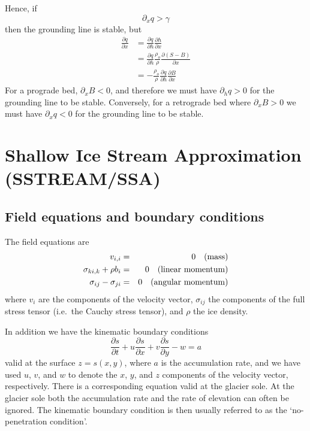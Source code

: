 \documentclass[10pt,a4paper]{book}
\newcommand{\p}{\partial}
\begin{document}
Hence, if
\[
  \p_x q > \gamma
\]
then the grounding line is stable, but
\begin{align*}
  \frac{\p q}{\p x} &= \frac{\p q}{\p h} \frac{\p h}{\p x} \\
  &= \frac{\p q}{\p h} \frac{\rho_o}{\rho} \frac{\p (S-B)}{\p x}\\
  &= -  \frac{\rho_o}{\rho}\frac{\p q}{\p h} \frac{\p B}{\p x}
\end{align*}
For a prograde bed, $\p_x B <0$, and therefore we must have $\p_h q >0$
for the grounding line to be stable. Conversely, for a retrograde bed where $\p_x
B > 0$ we must have $\p_x q <0$ for the grounding line to be stable.


\chapter{Shallow Ice Stream Approximation (SSTREAM/SSA)}


\section{Field equations and boundary conditions}

The field equations are
\begin{eqnarray}
v_{i,i}&=&0   \quad \hbox{(mass)}  \\ \sigma_{ki,k}+\rho
b_i&=&0  \quad \hbox{(linear momentum)}  \\ \sigma_{ij}
-\sigma_{ji} & = & 0\quad \hbox{(angular momentum)} 
\end{eqnarray}
where $v_i$ are the components of the velocity vector, $\sigma_{ij}$
the components of the full stress tensor (i.e.\ the Cauchy stress
tensor), and $\rho$ the ice density.


In addition we have the kinematic boundary conditions
\begin{equation}
\frac{\partial s}{\partial t}
+u\frac{\partial s}{\partial x}
+v\frac{\partial s}{\partial y}
-w=a
\label{eq:kinsurf}
\end{equation}
valid at the surface $z=s(x,y)$, where $a$ is the accumulation rate,
and we have used $u$, $v$, and $w$ to denote the $x$, $y$, and $z$
components of the velocity vector, respectively. There is a
corresponding equation valid at the glacier sole. At the glacier sole
both the accumulation rate and the rate of elevation can often be
ignored. The kinematic boundary condition is then usually referred to
as the `no-penetration condition'.
\end{document}
